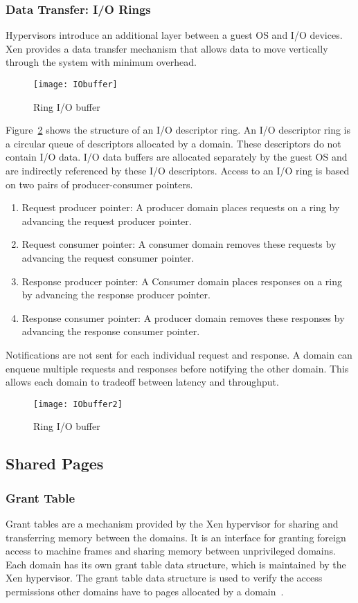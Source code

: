 \subsubsection*{Data Transfer: I/O Rings}
\label{subsec:io rings}
Hypervisors introduce an additional layer between a guest OS and I/O devices. Xen provides a data transfer mechanism that allows data to move vertically through the system with minimum overhead. 
\begin{figure}[!ht]
\centering
\texttt{[image: IObuffer]}
\caption{Ring I/O buffer}
\label{fig:Ring buffer}
\end{figure}

Figure~\ref{fig:Ring buffer} shows the structure of an I/O descriptor ring. An I/O descriptor ring is a circular queue of descriptors allocated by a domain. These descriptors do not contain I/O data. I/O data buffers are allocated separately by the guest OS and are indirectly referenced by these I/O descriptors. Access to an I/O ring is based on two pairs of producer-consumer pointers.
\begin{enumerate}
\item Request producer pointer: A producer domain places requests on a ring by advancing the request producer pointer. 
\item Request consumer pointer: A consumer domain removes these requests by advancing the request consumer pointer.
\item Response producer pointer: A Consumer domain places responses on a ring by advancing the response producer pointer. 
\item Response consumer pointer: A producer domain removes these responses by advancing the response consumer pointer.
\end{enumerate} 

Notifications are not sent for each individual request and response. A domain can enqueue multiple requests and responses before notifying the other domain. This allows each domain to tradeoff between latency and throughput.
\begin{figure}[!ht]
\centering
\texttt{[image: IObuffer2]}
\caption{Ring I/O buffer}
\label{fig:Ring buffer}
\end{figure}

\subsection*{Shared Pages}
\label{subsec:sharedpages}
\subsubsection*{Grant Table} 
Grant tables are a mechanism provided by the Xen hypervisor for sharing and transferring memory between the domains. It is an interface for granting foreign access to machine frames and sharing memory between unprivileged domains. Each domain has its own grant table data structure, which is maintained by the Xen hypervisor. The grant table data structure is used to verify the access permissions other domains have to pages allocated by a domain~\cite{granttable}.

